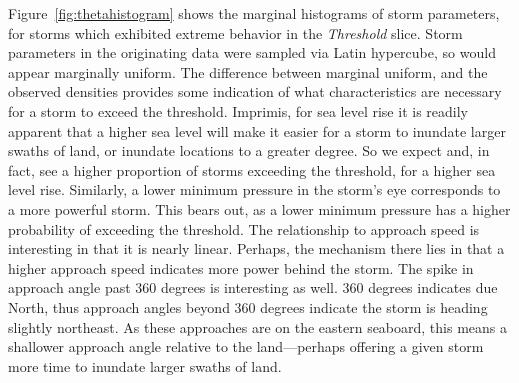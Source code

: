 Figure~\ref{fig:thetahistogram} shows the marginal histograms of storm parameters, for 
    storms which exhibited extreme behavior in the \emph{Threshold} slice.  Storm parameters 
    in the originating data were sampled via Latin hypercube, so would appear marginally
    uniform.  The difference between marginal uniform, and the observed densities provides
    some indication of what characteristics are necessary for a storm to exceed the threshold.
    Imprimis, for sea level rise it is readily apparent that a higher sea level will
    make it easier for a storm to inundate larger swaths of land, or inundate locations to a
    greater degree.  So we expect and, in fact, see a higher proportion of storms exceeding
    the threshold, for a higher sea level rise.  Similarly, a lower minimum pressure in the storm's
    eye corresponds to a more powerful storm.  This bears out, as a lower minimum pressure has
    a higher probability of exceeding the threshold.  The relationship to approach speed is 
    interesting in that it is nearly linear.  Perhaps, the mechanism there lies in that a higher
    approach speed indicates more power behind the storm.  The spike in approach angle past 360
    degrees is interesting as well. 360 degrees indicates due North, thus approach angles 
    beyond 360 degrees indicate the storm is heading slightly northeast. As these approaches are
    on the eastern seaboard, this means a shallower approach angle relative to the
    land---perhaps offering a given storm more time to inundate larger swaths of land.

